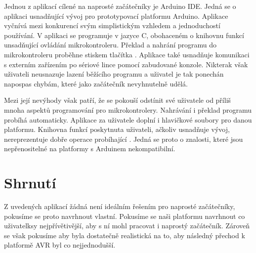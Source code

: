 Jednou z aplikací cílené na naprosté začátečníky je Arduino IDE\cite{arduino-ide}. Jedná se o aplikaci usnadňující vývoj pro prototypovací platformu Arduino. Aplikace vyčnívá mezi konkurencí svým simplistickým vzhledem a jednoduchostí používání. V aplikaci se programuje v jazyce C, obohaceném o knihovnu funkcí unsadňující ovládání mikrokontroleru. Překlad a nahrání programu do mikrokontroleru proběhne stiskem tlačítka . Aplikace také usnadňuje komunikaci s externím zařízením po sériové lince pomocí zabudované konzole. Nikterak však uživateli neusnazuje lazení běžícího programu a uživatel je tak ponechán napospas chybám, které jako začátečník nevyhnutelně udělá.

Mezi její nevýhody však patří, že se pokouší odstínit své uživatele od příliš mnoha aspektů programování pro mikrokontrolery. Nahrávání i překlad programu probíhá automaticky. Aplikace za uživatele doplní i hlavičkové soubory pro danou platformu. Knihovna funkcí poskytnuta uživateli, ačkoliv usnadňuje vývoj, nereprezentuje dobře operace probíhající . Jedná se proto o znalosti, které jsou nepřenositelné na platformy s Arduinem nekompatibilní.


\section{Shrnutí}

Z uvedených aplikací žádná není ideálním řešením pro naprosté začátečníky, pokusíme se proto navrhnout vlastní. Pokusíme se naši platformu navrhnout co uživatelksy nejpřívětivější, aby s ní mohl pracovat i naprostý začátečník. Zároveň se však pokusíme aby byla dostatečně realistická na to, aby následný přechod k platformě AVR byl co nejjednodušší.